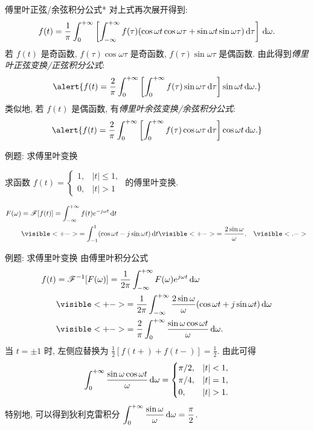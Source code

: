 \begin{frame}{傅里叶正弦/余弦积分公式*}
\onslide<+->
对上式再次展开得到:
\[f(t)=\frac1\pi\int_0^{+\infty}\left[\int_{-\infty}^{+\infty}f(\tau)(\cos{\omega t}\cos{\omega\tau}+\sin{\omega t}\sin{\omega\tau})\,\mathrm{d}\tau\right]\,\mathrm{d}\omega.\]
\onslide<+->
若 $f(t)$ 是奇函数, $f(\tau)\cos{\omega\tau}$ 是奇函数, $f(\tau)\sin{\omega\tau}$ 是偶函数.
\onslide<+->
由此得到\emph{傅里叶正弦变换/正弦积分公式}:
\[\alert{f(t)=\frac2\pi\int_0^{+\infty}\left[\int_0^{+\infty}f(\tau)\sin{\omega\tau}\diff\tau\right]\sin{\omega t}\diff\omega.}\]
\onslide<+->
类似地, 若 $f(t)$ 是偶函数, 有\emph{傅里叶余弦变换/余弦积分公式}:
\[\alert{f(t)=\frac2\pi\int_0^{+\infty}\left[\int_0^{+\infty}f(\tau)\cos{\omega\tau}\diff\tau\right]\cos{\omega t}\diff\omega.}\]
\end{frame}


\begin{frame}{例题: 求傅里叶变换}
\begin{example}
求函数 $f(t)=
	\begin{cases}
		1, & |t|\le 1,\\
		0, & |t|>1
	\end{cases}$
的傅里叶变换.
\end{example}

\begin{solution}
\vspace{-\baselineskip}
\begin{align*}
F(\omega)&=\msf[f(t)]=\int_{-\infty}^{+\infty}f(t)e^{-j\omega t}\diff t\\
&\visible<+->{=\int_{-1}^1(\cos{\omega t}-j\sin{\omega t})\diff t}\visible<+->{=\frac{2\sin \omega}{\omega}.}&\visible<.->{}
\end{align*}
\end{solution}
\end{frame}


\begin{frame}{例题: 求傅里叶变换}
\onslide<+->
由傅里叶积分公式
\begin{align*}
f(t)&=\msf^{-1}[F(\omega)]=\frac1{2\pi}\int_{-\infty}^{+\infty}F(\omega)e^{j\omega t}\diff\omega\\
&\visible<+->{=\frac1{2\pi}\int_{-\infty}^{+\infty}\frac{2\sin\omega}{\omega}(\cos{\omega t}+j\sin{\omega t})\diff \omega}\\
&\visible<+->{=\frac2\pi\int_0^{+\infty}\frac{\sin\omega\cos{\omega t}}{\omega}\diff \omega.}
\end{align*}
\onslide<+->
当 $t=\pm1$ 时, 左侧应替换为 $\frac12[f(t+)+f(t-)]=\frac12$.
\onslide<+->
由此可得
\[\int_0^{+\infty}\frac{\sin \omega\cos{\omega t}}\omega\diff\omega=\begin{cases}
\pi/2,&|t|<1,\\
\pi/4,&|t|=1,\\
0,&|t|>1.
\end{cases}\]
\onslide<+->
特别地, 可以得到狄利克雷积分
$\displaystyle\int_0^{+\infty}\frac{\sin\omega}\omega\,\mathrm{d}\omega=\frac\pi2$.
\end{frame}


